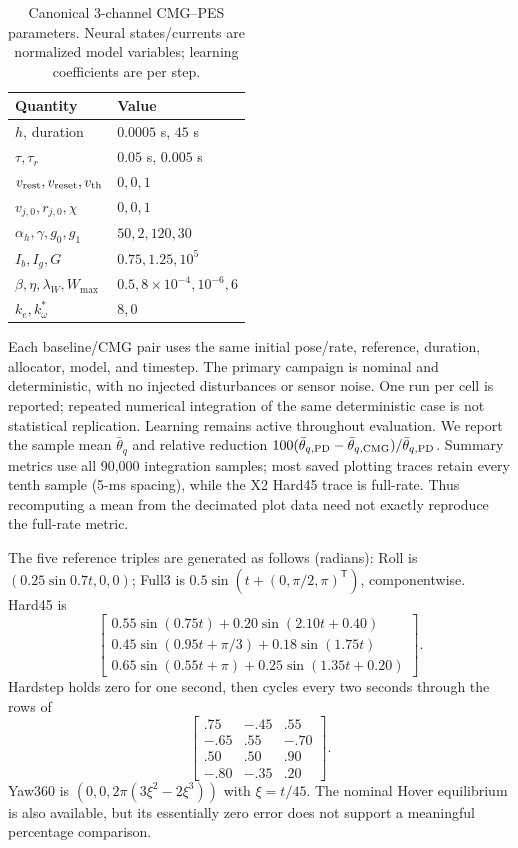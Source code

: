 \documentclass[letterpaper, 10 pt, conference]{ieeeconf}
\newcommand{\T}{^{\mathsf T}}
\begin{document}
\begin{table}[t]
\caption{Canonical 3-channel CMG--PES parameters. Neural states/currents
are normalized model variables; learning coefficients are per step.}
\label{tab:parameters}\centering\small
\begin{tabular}{ll}
\toprule
Quantity & Value\\\midrule
$h$, duration & $0.0005$ s, $45$ s\\
$\tau,\tau_r$ & $0.05$ s, $0.005$ s\\
$v_{\rm rest},v_{\rm reset},v_{\rm th}$ & $0,0,1$\\
$v_{j,0},r_{j,0},\chi$ & $0,0,1$\\
$\alpha_h,\gamma,g_0,g_1$ & $50,2,120,30$\\
$I_b,I_g,G$ & $0.75,1.25,10^5$\\
$\beta,\eta,\lambda_W,W_{\max}$ & $0.5,8\times10^{-4},10^{-6},6$\\
$k_e,k_\omega^*$ & $8,0$\\
\bottomrule
\end{tabular}
\end{table}

Each baseline/CMG pair uses the same initial pose/rate, reference, duration,
allocator, model, and timestep. The primary campaign is nominal and
deterministic, with no injected disturbances or sensor noise. One run per
cell is reported; repeated numerical integration of the same deterministic
case is not statistical replication. Learning remains active throughout
evaluation. We report the sample mean $\bar\theta_q$ and relative reduction
$100(\bar\theta_{q,\rm PD}-\bar\theta_{q,\rm CMG})/\bar\theta_{q,\rm PD}$.
Summary metrics use all 90,000 integration samples; most saved plotting
traces retain every tenth sample (5-ms spacing), while the X2 Hard45
trace is full-rate. Thus recomputing a mean from
the decimated plot data need not exactly reproduce the full-rate metric.

The five reference triples are generated as follows (radians):
Roll is $(0.25\sin0.7t,0,0)$; Full3 is
$0.5\sin(t+(0,\pi/2,\pi)\T)$, componentwise. Hard45 is
\begin{equation}
 \begin{bmatrix}
 0.55\sin(0.75t)+0.20\sin(2.10t+0.40)\\
 0.45\sin(0.95t+\pi/3)+0.18\sin(1.75t)\\
 0.65\sin(0.55t+\pi)+0.25\sin(1.35t+0.20)
 \end{bmatrix}.
\end{equation}
Hardstep holds zero for one second, then cycles every two seconds through
the rows of
\begin{equation}
 \begin{bmatrix}
 .75&-.45&.55\\-.65&.55&-.70\\.50&.50&.90\\-.80&-.35&.20
 \end{bmatrix}.
\end{equation}
Yaw360 is $(0,0,2\pi(3\xi^2-2\xi^3))$ with $\xi=t/45$.
The nominal Hover equilibrium is also available, but its essentially zero
error does not support a meaningful percentage comparison.
\end{document}
